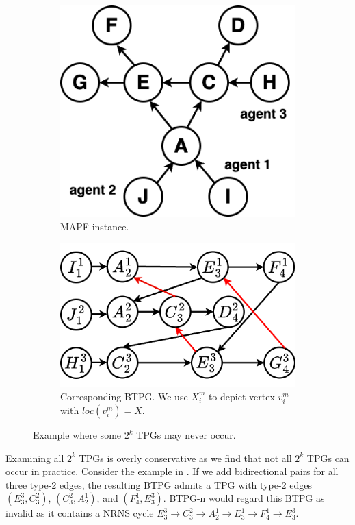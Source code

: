 \documentclass[letterpaper]{article}
\theoremstyle{definition}
\begin{document}
\begin{figure}[t]
\begin{subfigure}[a]{0.4\linewidth}
\centering
\includegraphics[width=0.87\linewidth]{Figs/examplePath.png}
\caption{MAPF instance.}
\label{fig: example path}
\end{subfigure}
\hfill
\begin{subfigure}[a]{0.59\linewidth}
\centering
\includegraphics[width=.9\linewidth]{Figs/exampleBTPG.png}
\caption{Corresponding BTPG. We use $X_i^m$ to depict vertex $v_i^m$ with $loc(v_i^m)=X$.}
\label{fig: example BTPG}
\end{subfigure}

\caption{Example where some $2^k$ TPGs may never occur.}\label{fig:counter-example}
\end{figure}


Examining all $2^k$ TPGs is overly conservative as we find that not all $2^k$ TPGs can occur in practice. Consider the example in . If we add bidirectional pairs for all three type-2 edges, the resulting BTPG admits a TPG with type-2 edges $(E^3_3,C_3^2)$, $(C_3^2,A_2^1)$, and $(F^1_4,E^3_3)$. BTPG-n would regard this BTPG as invalid as it contains a NRNS cycle $E^3_3 \rightarrow C^2_3 \rightarrow A^1_2  \rightarrow E^1_3 \rightarrow F^1_4 \rightarrow E^3_3$.
\end{document}
